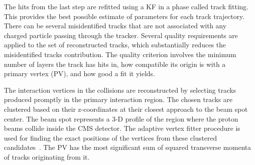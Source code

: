 The hits from the last step are refitted using a KF in a phase called track fitting. This provides the best possible estimate of parameters for each track trajectory. There can be several misidentified tracks that are not associated with any charged particle passing through the tracker. Several quality requirements are applied to the set of reconstructed tracks, which substantially reduces the misidentified tracks contribution. The quality criterion involves the minimum number of layers the track has hits in, how compatible its origin is with a primary vertex (PV), and how good a fit it yields.

The interaction vertices in the \pp collisions are reconstructed by selecting tracks produced promptly in the primary interaction region. The chosen tracks are clustered based on their z-coordinates at their closest approach to the beam spot center. The beam spot represents a 3-D profile of the region where the proton beams collide inside the CMS detector. The adaptive vertex fitter procedure is used for finding the exact positions of the vertices from these clustered candidates~\cite{Fruhwirth:2007hz}. The PV has the most significant sum of squared transverse momenta of tracks originating from it.

